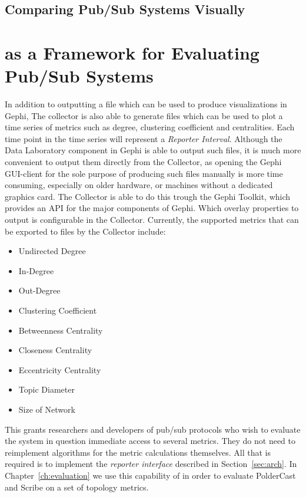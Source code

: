 \subsection{Comparing Pub/Sub Systems Visually}

\section{\demo as a Framework for Evaluating Pub/Sub Systems}
\label{sec:viz_eval}

In addition to outputting a \gexf file which can be used to produce
visualizations in Gephi, The collector is also able to generate \csv
files which can be used to plot a time series of metrics such as degree,
clustering coefficient and centralities. Each time point in the time
series will represent a \emph{Reporter Interval}. Although the Data
Laboratory component in Gephi is able to output such \csv files, it is
much more convenient to output them directly from the Collector, as
opening the Gephi GUI-client for the sole purpose of producing such
files manually is more time consuming, especially on older hardware, or
machines without a dedicated graphics card. The Collector is able to do
this trough the Gephi Toolkit, which provides an API for the major
components of Gephi. Which overlay properties to
output is configurable in the Collector.  Currently, the supported
metrics that can be exported to \csv files by the Collector include:

\begin{itemize}
    \item Undirected Degree
    \item In-Degree
    \item Out-Degree
    \item Clustering Coefficient
    \item Betweenness Centrality
    \item Closeness Centrality
    \item Eccentricity Centrality
    \item Topic Diameter
    \item Size of Network
\end{itemize}

This grants researchers and developers of pub/sub protocols who wish to evaluate
the system in question immediate access to several metrics. They do not need to
reimplement algorithms for the metric calculations themselves. All that is
required is to implement the \emph{reporter interface} described in
Section~\ref{sec:arch}. In Chapter~\ref{ch:evaluation} we use this capability of \demo in
order to evaluate PolderCast and Scribe on a set of topology metrics.

